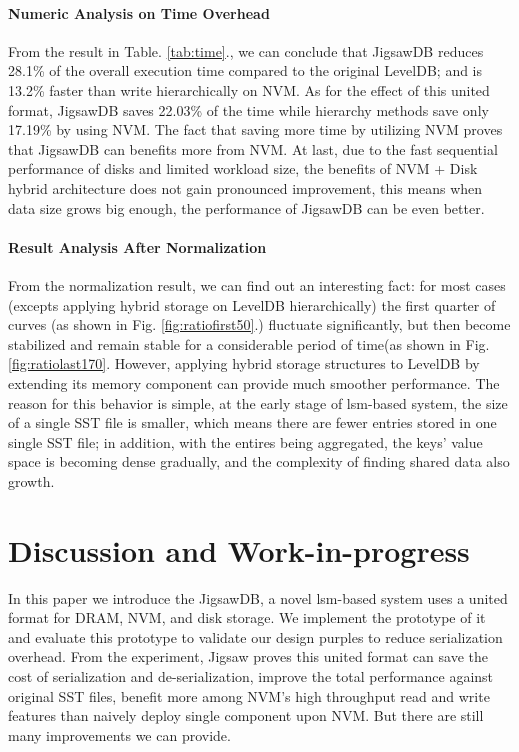 \paragraph{Numeric Analysis on Time Overhead} From the result in Table. \ref{tab:time}., we can conclude that JigsawDB reduces 28.1\% of the overall execution time compared to the original LevelDB; and is 13.2\% faster than write hierarchically on NVM. As for the effect of this united format, JigsawDB saves 22.03\% of the time while hierarchy methods save only 17.19\% by using NVM. The fact that saving more time by utilizing NVM proves that JigsawDB can benefits more from NVM. At last, due to the fast sequential performance of disks and limited workload size, the benefits of NVM + Disk hybrid architecture does not gain pronounced improvement, this means when data size grows big enough, the performance of JigsawDB can be even better. 

\paragraph{Result Analysis After Normalization} 

From the normalization result, we can find out an interesting fact: for most cases (excepts applying hybrid storage on LevelDB hierarchically) the first quarter of curves (as shown in Fig.  \ref{fig:ratiofirst50}.) fluctuate significantly, but then become stabilized and remain stable for a considerable period of time(as shown in Fig. \ref{fig:ratiolast170}. However, applying hybrid storage structures to LevelDB by extending its memory component can provide much smoother performance. The reason for this behavior is simple, at the early stage of lsm-based system, the size of a single SST file is smaller, which means there are fewer entries stored in one single SST file; in addition, with the entires being aggregated, the keys' value space is becoming dense gradually, and the complexity of finding shared data also growth. 


\section{Discussion and Work-in-progress}
In this paper we introduce the JigsawDB, a novel lsm-based system uses a united format for DRAM, NVM, and disk storage. We implement the prototype of it and evaluate this prototype to validate our design purples to reduce serialization overhead. From the experiment, Jigsaw proves this united format can save the cost of serialization and de-serialization, improve the total performance against original SST files, benefit more among NVM's high throughput read and write features than naively deploy single component upon NVM. But there are still many improvements we can provide.

